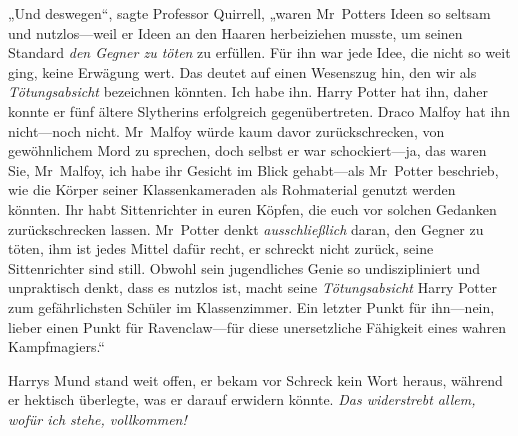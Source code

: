 „Und deswegen“, sagte Professor Quirrell, „waren Mr~Potters Ideen so seltsam und nutzlos—weil er Ideen an den Haaren herbeiziehen musste, um seinen Standard \emph{den Gegner zu töten} zu erfüllen. Für ihn war jede Idee, die nicht so weit ging, keine Erwägung wert. Das deutet auf einen Wesenszug hin, den wir als \emph{Tötungsabsicht} bezeichnen könnten. Ich habe ihn. Harry Potter hat ihn, daher konnte er fünf ältere Slytherins erfolgreich gegenübertreten. Draco Malfoy hat ihn nicht—noch nicht. Mr~Malfoy würde kaum davor zurückschrecken, von gewöhnlichem Mord zu sprechen, doch selbst er war schockiert—ja, das waren Sie, Mr~Malfoy, ich habe ihr Gesicht im Blick gehabt—als Mr~Potter beschrieb, wie die Körper seiner Klassenkameraden als Rohmaterial genutzt werden könnten. Ihr habt Sittenrichter in euren Köpfen, die euch vor solchen Gedanken zurückschrecken lassen. Mr~Potter denkt \emph{ausschließlich} daran, den Gegner zu töten, ihm ist jedes Mittel dafür recht, er schreckt nicht zurück, seine Sittenrichter sind still. Obwohl sein jugendliches Genie so undiszipliniert und unpraktisch denkt, dass es nutzlos ist, macht seine \emph{Tötungsabsicht} Harry Potter zum gefährlichsten Schüler im Klassenzimmer. Ein letzter Punkt für ihn—nein, lieber einen Punkt für Ravenclaw—für diese unersetzliche Fähigkeit eines wahren Kampfmagiers.“

Harrys Mund stand weit offen, er bekam vor Schreck kein Wort heraus, während er hektisch überlegte, was er darauf erwidern könnte. \emph{Das widerstrebt allem, wofür ich stehe, vollkommen!}

